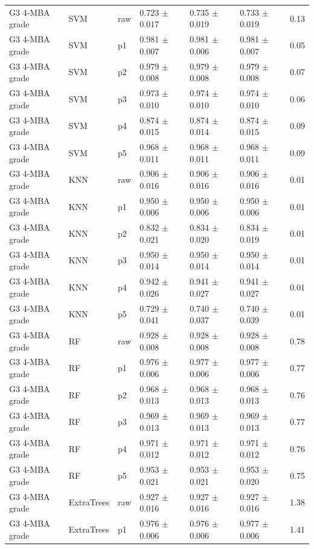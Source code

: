 {\begin{longtable}{L{2.35cm}L{2.4cm}L{1.0cm}L{2.35cm}L{2.25cm}L{2.25cm}L{1.45cm}}
G3 4-MBA grade & SVM & raw & 0.723 $\pm$ 0.017 & 0.735 $\pm$ 0.019 & 0.733 $\pm$ 0.019 & 0.13 \\
G3 4-MBA grade & SVM & p1 & 0.981 $\pm$ 0.007 & 0.981 $\pm$ 0.006 & 0.981 $\pm$ 0.007 & 0.05 \\
G3 4-MBA grade & SVM & p2 & 0.979 $\pm$ 0.008 & 0.979 $\pm$ 0.008 & 0.979 $\pm$ 0.008 & 0.07 \\
G3 4-MBA grade & SVM & p3 & 0.973 $\pm$ 0.010 & 0.974 $\pm$ 0.010 & 0.974 $\pm$ 0.010 & 0.06 \\
G3 4-MBA grade & SVM & p4 & 0.874 $\pm$ 0.015 & 0.874 $\pm$ 0.014 & 0.874 $\pm$ 0.015 & 0.09 \\
G3 4-MBA grade & SVM & p5 & 0.968 $\pm$ 0.011 & 0.968 $\pm$ 0.011 & 0.968 $\pm$ 0.011 & 0.09 \\
G3 4-MBA grade & KNN & raw & 0.906 $\pm$ 0.016 & 0.906 $\pm$ 0.016 & 0.906 $\pm$ 0.016 & 0.01 \\
G3 4-MBA grade & KNN & p1 & 0.950 $\pm$ 0.006 & 0.950 $\pm$ 0.006 & 0.950 $\pm$ 0.006 & 0.01 \\
G3 4-MBA grade & KNN & p2 & 0.832 $\pm$ 0.021 & 0.834 $\pm$ 0.020 & 0.834 $\pm$ 0.019 & 0.01 \\
G3 4-MBA grade & KNN & p3 & 0.950 $\pm$ 0.014 & 0.950 $\pm$ 0.014 & 0.950 $\pm$ 0.014 & 0.01 \\
G3 4-MBA grade & KNN & p4 & 0.942 $\pm$ 0.026 & 0.941 $\pm$ 0.027 & 0.941 $\pm$ 0.027 & 0.01 \\
G3 4-MBA grade & KNN & p5 & 0.729 $\pm$ 0.041 & 0.740 $\pm$ 0.037 & 0.740 $\pm$ 0.039 & 0.01 \\
G3 4-MBA grade & RF & raw & 0.928 $\pm$ 0.008 & 0.928 $\pm$ 0.008 & 0.928 $\pm$ 0.008 & 0.78 \\
G3 4-MBA grade & RF & p1 & 0.976 $\pm$ 0.006 & 0.977 $\pm$ 0.006 & 0.977 $\pm$ 0.006 & 0.77 \\
G3 4-MBA grade & RF & p2 & 0.968 $\pm$ 0.013 & 0.968 $\pm$ 0.013 & 0.968 $\pm$ 0.013 & 0.76 \\
G3 4-MBA grade & RF & p3 & 0.969 $\pm$ 0.013 & 0.969 $\pm$ 0.013 & 0.969 $\pm$ 0.013 & 0.77 \\
G3 4-MBA grade & RF & p4 & 0.971 $\pm$ 0.012 & 0.971 $\pm$ 0.012 & 0.971 $\pm$ 0.012 & 0.76 \\
G3 4-MBA grade & RF & p5 & 0.953 $\pm$ 0.021 & 0.953 $\pm$ 0.021 & 0.953 $\pm$ 0.020 & 0.75 \\
G3 4-MBA grade & ExtraTrees & raw & 0.927 $\pm$ 0.016 & 0.927 $\pm$ 0.016 & 0.927 $\pm$ 0.016 & 1.38 \\
G3 4-MBA grade & ExtraTrees & p1 & 0.976 $\pm$ 0.006 & 0.976 $\pm$ 0.006 & 0.977 $\pm$ 0.006 & 1.41 \\

\end{longtable}}
